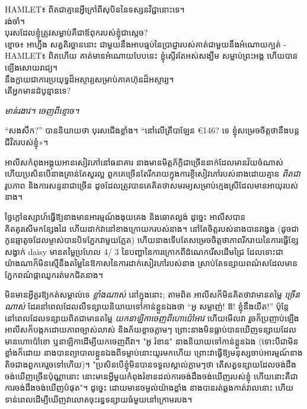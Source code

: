 \begin{playdialog}
HAMLET៖ ពិតជាគ្មានអ្វីក្រៅពីសុបិននៃទស្សនវិជ្ជានោះទេ។\\
រង់ចាំ។\\
បុរស​ដែល​ខ្ញុំ​ត្រូវ​សម្លាប់​គឺ​ជា​ឪពុក​របស់​ខ្ញុំ​ជា​ស្តេច?\\

ខ្មោច៖ អាហ្នឹង សត្វតិរច្ឆាននោះ
ជាមួយនឹងអាបធ្មប់នៃប្រាជ្ញារបស់គាត់ជាមួយនឹងអំណោយក្បត់ -\\

HAMLET៖ ពិតហើយ គាត់មានអំណោយបែបនេះ ខ្ញុំស្ទើរតែអស់សង្ឃឹម
សម្លាប់ព្រះអង្គ ហើយបានឡើងសោយរាជ្យ។\\
នឹងក្លាយជាការប្រយុទ្ធដ៏អស្ចារ្យសម្រាប់ភាគហ៊ុនដ៏អស្ចារ្យ។\\
តើអ្នកមានដំបូន្មានទេ?

\emph{មាន់រងាវ។ ចេញពីខ្មោច។}
\end{playdialog}


“សងសឹក?” បាននិយាយថា បុរសជើងខ្លាំង។ “នៅលើត្រីបាឡែន €146? ទេ ខ្ញុំ​សម្រេច​ចិត្ត​ថា​នឹង​បន្ត​ជីវិត​របស់​ខ្ញុំ»។


អាលីសកំពុងអង្គុយអានសៀវភៅនៅធនាគារ នាងមានមិត្តភ័ក្តិជាច្រើននាក់ដែលមានវ័យចំណាស់ ហើយប្រសិនបើនាងគ្រាន់តែសួរល្អ ពួកគេច្រើនតែរីករាយក្នុងការខ្ចីសៀវភៅរបស់នាងដោយគ្មាន \emph{ពិតជា} រូបភាព និងការសន្ទនាជាច្រើន ដូចដែលត្រូវបានគេគិតថាសមរម្យសម្រាប់ក្មេងស្រីដែលមានអាយុរបស់នាង។

ថ្ងៃក្តៅឧស្សាហ៍ធ្វើឱ្យនាងមានអារម្មណ៍ងងុយគេង និងឆោតល្ងង់ ដូច្នេះ អាលីសបានគិតគូរសើមកន្សែងដៃ ហើយដាក់វានៅខាងក្រោយករបស់នាង។ នៅតែចិត្តរបស់នាងបានវង្វេង (ដូចជាកូនឆ្មាតូចដែលម្ចាស់បានបិទភ្នែកវាមួយភ្លែត) ហើយនាងទើបតែសម្រេចចិត្តថាភាពរីករាយនៃការធ្វើខ្សែសង្វាក់ daisy មានតម្លៃប្រហែល 4/ 3 នៃបញ្ហានៃការក្រោកពីដំណេករើសដើមជ្រៃ ដែលទោះជាយ៉ាងណាក៏មិនស្មើនឹងតម្លៃនៃឱកាសនៃការដាក់សៀវភៅរបស់នាង ស្រាប់តែទន្សាយពណ៌សដែលមានភ្នែកពណ៌ផ្កាឈូករត់មកជិតនាង។

មិនមានអ្វីគួរឱ្យកត់សម្គាល់ទេ \emph{ខ្លាំងណាស់} នៅក្នុងនោះ; តាមពិត អាលីសក៏មិនគិតថាវាមានតម្លៃ \emph{ ច្រើនណាស់ } ដែរនៅពេលដែលលឺទន្សាយនិយាយទៅកាន់ខ្លួនឯងថា “អូ សម្លាញ់! ឱ! ខ្ញុំនឹងយឺត!” ប៉ុន្តែនៅពេលដែលទន្សាយពិតជាមានតម្លៃ \emph{យកនាឡិកាចេញពីហោប៉ៅអាវ} ហើយមើលវា រួចក៏ប្រញាប់ឡើង អាលីសក៏បង្កកដោយភាពច្បាស់លាស់ និងភ័យខ្លាចភ្លាមៗ ព្រោះនាងមិនធ្លាប់បានឃើញទន្សាយដែលមានហោប៉ៅខោ ឬនាឡិកាដើម្បីយកចេញពីវា។ "អូ រំខាន" នាងនិយាយទៅកាន់ខ្លួនឯង (ទោះបីជាមិនខ្លាំងក៏ដោយ នាងបានព្យាបាលខ្លួនឯងពីទម្លាប់នោះយូរមកហើយ ព្រោះវាធ្វើឱ្យមនុស្សចាប់អារម្មណ៍នាងតិចជាងពួកគេរួចទៅហើយ)។ "ប្រសិនបើខ្ញុំមិនបានទទួលស្គាល់ភ្លាមៗថា តើសត្វទន្សាយដែលចង់ដឹងចង់ឃើញច្រើនប៉ុណ្ណានោះ នោះមានអ្វីមួយកំពុងរំខានដល់ការចង់ដឹងចង់ឃើញរបស់ខ្ញុំ ហើយនោះគឺជាការចង់ដឹងចង់ឃើញបំផុត"។ ដូច្នេះ ដោយ​មាន​ចម្ងល់​យ៉ាង​ខ្លាំង នាង​បាន​រត់​ឆ្លង​កាត់​វាល​នោះ ហើយ​ទាន់​ពេល​ដើម្បី​ឃើញ​វា​លោត​ចុះ​រន្ធ​ទន្សាយ​ធំ​មួយ​នៅ​ក្រោម​របង។

